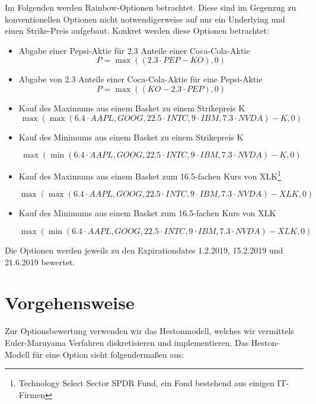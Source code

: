 \documentclass[12pt]{article}
\begin{document}
Im Folgenden werden Rainbow-Optionen betrachtet. Diese sind im Gegenzug zu konventionellen Optionen nicht notwendigerweise auf nur ein Underlying und einen Strike-Preis aufgebaut.
\newline
Konkret werden diese Optionen betrachtet:
\begin{itemize}
	\item Abgabe einer Pepsi-Aktie für 2.3 Anteile einer Coca-Cola-Aktie
		\begin{equation*}
	P=\max((2.3\cdot PEP-KO),0)
	\end{equation*}	
	\item Abgabe von 2.3 Anteile einer Coca-Cola-Aktie für eine Pepsi-Aktie
	\begin{equation*}
	P=\max((KO-2.3\cdot PEP),0)
	\end{equation*}	
	\item Kauf des Maximums aus einem Basket zu einem Strikepreis K
	\begin{equation*}
	\max(\max(6.4 \cdot AAPL,GOOG,22.5 \cdot INTC, 9 \cdot IBM, 7.3 \cdot NVDA)-K,0)
	\end{equation*}
	\item Kauf des Minimums aus einem Basket zu einem Strikepreis K
	
	\begin{equation*}
	\max(\min(6.4 \cdot AAPL,GOOG,22.5 \cdot INTC, 9 \cdot IBM, 7.3 \cdot NVDA)-K,0)
	\end{equation*}
	\item Kauf des Maximums aus einem Basket zum 16.5-fachen Kurs von XLK\footnote{Technology Select Sector SPDR Fund, ein Fond bestehend aus einigen IT-Firmen}
	
	\begin{equation*}
	\max(\max(6.4 \cdot AAPL,GOOG,22.5 \cdot INTC, 9 \cdot IBM, 7.3 \cdot NVDA)-XLK,0)
	\end{equation*}
	\item Kauf des Minimums aus einem Basket zum 16.5-fachen Kurs von XLK
	
	\begin{equation*}
	\max(\min(6.4 \cdot AAPL,GOOG,22.5 \cdot INTC, 9 \cdot IBM, 7.3 \cdot NVDA)-XLK,0)
	\end{equation*}
	

\end{itemize}

Die Optionen werden jeweils zu den Expirationdates 1.2.2019, 15.2.2019 und 21.6.2019 bewertet.
\section*{Vorgehensweise}
Zur Optionsbewertung verwenden wir das Hestonmodell, welches wir vermittels Euler-Maruyama Verfahren diskretisieren und implementieren.
Das Heston-Modell für eine Option sieht folgendermaßen aus:
\end{document}
